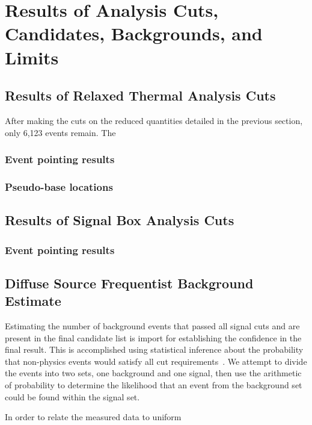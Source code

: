			
\chapter{Results of Analysis Cuts, Candidates, Backgrounds, and Limits}


\section{Results of Relaxed Thermal Analysis Cuts}
		After making the cuts on the reduced quantities detailed in the previous section, only 6,123 events remain.  The 

	
	\subsection{Event pointing results}
	

	\subsection{Pseudo-base locations}


\section{Results of Signal Box Analysis Cuts}

	\subsection{Event pointing results}
	



\section{Diffuse Source Frequentist Background Estimate}
	Estimating the number of background events that passed all signal cuts and are present in the final candidate list is import for establishing the confidence in the final result.  This is accomplished using statistical inference about the probability that non-physics events would satisfy all cut requirements~\cite{ClassicalStatisticalEstimation}.  We attempt to divide the events into two sets, one background and one signal, then use the arithmetic of probability to determine the likelihood that an event from the background set could be found within the signal set.  

	In order to relate the measured data to uniform 
	
